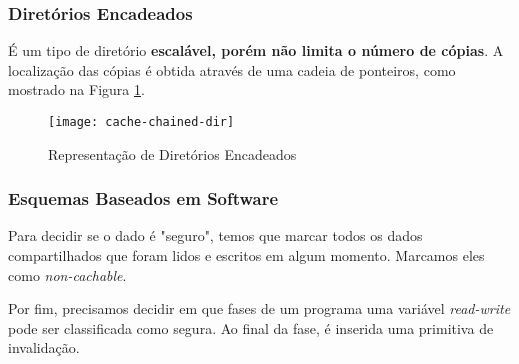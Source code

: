 \subsubsection{Diretórios Encadeados}
É um tipo de diretório \textbf{escalável, porém não limita o número de cópias}. A localização das cópias é obtida através de uma cadeia de ponteiros, como mostrado na Figura \ref{fig:cache-chained-dir}.

\begin{figure}[!ht]
  \centering
  \texttt{[image: cache-chained-dir]}
  \caption{Representação de Diretórios Encadeados}
  \label{fig:cache-chained-dir}
\end{figure}




\subsubsection{Esquemas Baseados em Software}
Para decidir se o dado é "seguro", temos que marcar todos os dados compartilhados que foram lidos e escritos em algum momento. Marcamos eles como \textit{non-cachable}.

Por fim, precisamos decidir em que fases de um programa uma variável \textit{read-write} pode ser classificada como segura. Ao final da fase, é inserida uma primitiva de invalidação.
